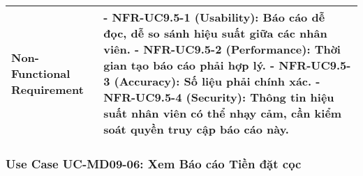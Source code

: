 \begin{longtable}{|m{4cm}|p{11cm}|}
\hline
Non-Functional Requirement & - \textbf{NFR-UC9.5-1 (Usability):} Báo cáo dễ đọc, dễ so sánh hiệu suất giữa các nhân viên. \newline - \textbf{NFR-UC9.5-2 (Performance):} Thời gian tạo báo cáo phải hợp lý. \newline - \textbf{NFR-UC9.5-3 (Accuracy):} Số liệu phải chính xác. \newline - \textbf{NFR-UC9.5-4 (Security):} Thông tin hiệu suất nhân viên có thể nhạy cảm, cần kiểm soát quyền truy cập báo cáo này. \\
\hline
\end{longtable}

\subsubsection{Use Case UC-MD09-06: Xem Báo cáo Tiền đặt cọc}

